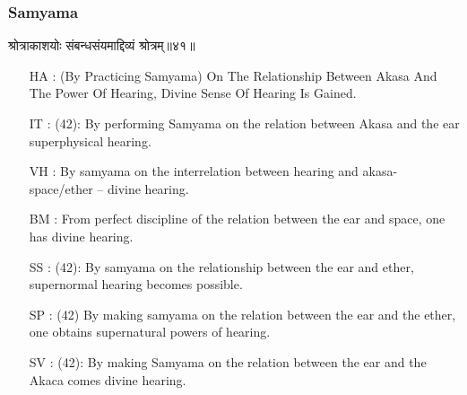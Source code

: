 \begin{frame}[fragile]\frametitle{Samyama}
\begin{sanskrit}
श्रोत्राकाशयोः संबन्धसंयमाद्दिव्यं श्रोत्रम्॥४१॥
\end{sanskrit}
	\begin{itemize}
	\item [HA]: (By Practicing Samyama) On The Relationship Between Akasa And The Power Of Hearing, Divine Sense Of Hearing Is Gained.
	\item [IT]: (42): By performing Samyama on the relation between Akasa and the ear superphysical hearing.
	\item [VH]: By samyama on the interrelation between hearing and akasa- space/ether – divine hearing.
	\item [BM]: From perfect discipline of the relation between the ear and space, one has divine hearing.
	\item [SS]: (42): By samyama on the relationship between the ear and ether, supernormal hearing becomes possible.
	\item [SP]: (42) By making samyama on the relation between the ear and the ether, one obtains supernatural powers of hearing.
	\item [SV]: (42): By making Samyama on the relation between the ear and the Akaca comes divine hearing.
	\end{itemize}
\end{frame}


